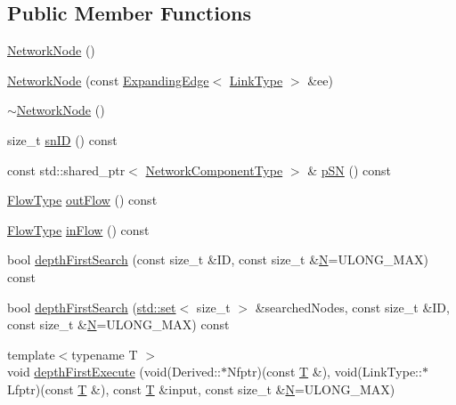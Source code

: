 \subsection*{Public Member Functions}
\begin{DoxyCompactItemize}
\item 
\hyperlink{classmodel_1_1_network_node_a8070b3d096b3f54bbfb3fb7ed5ab3249}{Network\+Node} ()
\item 
\hyperlink{classmodel_1_1_network_node_ac2ff4cb3296df4e081d43c72a6d41756}{Network\+Node} (const \hyperlink{structmodel_1_1_expanding_edge}{Expanding\+Edge}$<$ \hyperlink{_spline_node_base__corder0_8h_ab09ccc0af6ea9402dfef7b0eac55cff3}{Link\+Type} $>$ \&ee)
\item 
\hyperlink{classmodel_1_1_network_node_affb13503558b52702e518a484bff4768}{$\sim$\+Network\+Node} ()
\item 
size\+\_\+t \hyperlink{classmodel_1_1_network_node_aee1b47fc77e071441069dbb4ed5221ab}{sn\+I\+D} () const 
\item 
const std\+::shared\+\_\+ptr$<$ \hyperlink{_network_typedefs_8h_ace62a87e27b01659142c49a8712f3dc9}{Network\+Component\+Type} $>$ \& \hyperlink{classmodel_1_1_network_node_afc87b48ebe689415b2c78fc6c922e727}{p\+S\+N} () const 
\item 
\hyperlink{_spline_segment_base__common_8h_aec2b17f3c09c54f93636cbedceffde56}{Flow\+Type} \hyperlink{classmodel_1_1_network_node_a0023d0583b09a66e7a66c508b3291dd6}{out\+Flow} () const 
\item 
\hyperlink{_spline_segment_base__common_8h_aec2b17f3c09c54f93636cbedceffde56}{Flow\+Type} \hyperlink{classmodel_1_1_network_node_aa2e2e9828d4c71390737313bc69a5086}{in\+Flow} () const 
\item 
bool \hyperlink{classmodel_1_1_network_node_a2abfe4106e1a958ba98cadc0bdd2ad1b}{depth\+First\+Search} (const size\+\_\+t \&I\+D, const size\+\_\+t \&\hyperlink{thompson__tetrahedron_8m_a7823765a845eb81829f110d8337f81ae}{N}=U\+L\+O\+N\+G\+\_\+\+M\+A\+X) const 
\item 
bool \hyperlink{classmodel_1_1_network_node_adcd220a078c4d183e6bd416f0bfcabd3}{depth\+First\+Search} (\hyperlink{plot_cells_8m_a03623d69001c34fc77654be29bdc3d8a}{std\+::set}$<$ size\+\_\+t $>$ \&searched\+Nodes, const size\+\_\+t \&I\+D, const size\+\_\+t \&\hyperlink{thompson__tetrahedron_8m_a7823765a845eb81829f110d8337f81ae}{N}=U\+L\+O\+N\+G\+\_\+\+M\+A\+X) const 
\item 
{\footnotesize template$<$typename T $>$ }\\void \hyperlink{classmodel_1_1_network_node_ad972a3023298cd2f9163dcac252bdaac}{depth\+First\+Execute} (void(Derived\+::$\ast$Nfptr)(const \hyperlink{_spline_node_base__corder1_8h_a82692d3a5502b91460591f1d5504314a}{T} \&), void(Link\+Type\+::$\ast$Lfptr)(const \hyperlink{_spline_node_base__corder1_8h_a82692d3a5502b91460591f1d5504314a}{T} \&), const \hyperlink{_spline_node_base__corder1_8h_a82692d3a5502b91460591f1d5504314a}{T} \&input, const size\+\_\+t \&\hyperlink{thompson__tetrahedron_8m_a7823765a845eb81829f110d8337f81ae}{N}=U\+L\+O\+N\+G\+\_\+\+M\+A\+X)

\end{DoxyCompactItemize}
